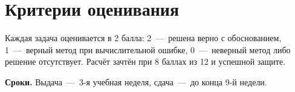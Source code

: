 \documentclass[12pt, a4paper]{article}
\begin{document}
\section*{Критерии оценивания}

Каждая задача оценивается в 2 балла: 2~---~решена верно с обоснованием,
1~---~верный метод при вычислительной ошибке, 0~---~неверный метод либо
решение отсутствует. Расчёт зачтён при 8 баллах из 12 и успешной защите.

\vspace{0.7em}
\noindent\textbf{Сроки.} Выдача~---~3-я учебная неделя,
сдача~---~до конца 9-й недели.
\end{document}
